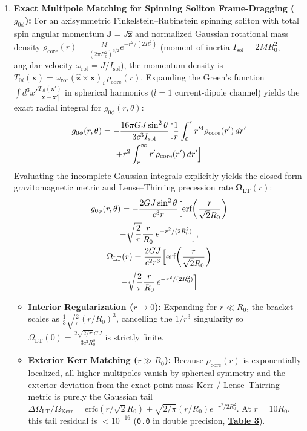 \documentclass[10pt,aps,prd,twocolumn,superscriptaddress,nofootinbib,floatfix,longbibliography,showkeys]{revtex4-2}
\begin{document}
\begin{enumerate}
  \item \textbf{Exact Multipole Matching for Spinning Soliton Frame-Dragging ($g_{0\phi}$):} For an axisymmetric Finkelstein--Rubinstein spinning soliton with total spin angular momentum $\mathbf{J} = J\hat{\mathbf{z}}$ and normalized Gaussian rotational mass density $\rho_{\text{core}}(r) = \frac{M}{(2\pi R_0^2)^{3/2}}e^{-r^2/(2R_0^2)}$ (moment of inertia $I_{\text{sol}} = 2 M R_0^2$, angular velocity $\omega_{\text{rot}} = J / I_{\text{sol}}$), the momentum density is $T_{0i}(\mathbf{x}) = \omega_{\text{rot}}(\hat{\mathbf{z}} \times \mathbf{x})_i\,\rho_{\text{core}}(r)$. Expanding the Green's function $\int d^3x' \frac{T_{0i}(\mathbf{x}')}{|\mathbf{x} - \mathbf{x}'|}$ in spherical harmonics ($l=1$ current-dipole channel) yields the exact radial integral for $g_{0\phi}(r, \theta)$:
\begin{multline}
g_{0\phi}(r, \theta) = -\frac{16\pi G J \sin^2\theta}{3 c^3 I_{\text{sol}}}\Bigl[ \frac{1}{r}\int_0^r r'^4 \rho_{\text{core}}(r')\,dr' \\
+ r^2 \int_r^\infty r' \rho_{\text{core}}(r')\,dr' \Bigr]
\end{multline}
  Evaluating the incomplete Gaussian integrals explicitly yields the closed-form gravitomagnetic metric and Lense--Thirring precession rate $\boldsymbol{\Omega}_{\text{LT}}(r)$:
\begin{equation}\begin{gathered}
g_{0\phi}(r, \theta) = -\frac{2 G J \sin^2\theta}{c^3 r}\Bigl[ \text{erf}\!\left(\frac{r}{\sqrt{2}R_0}\right) \\
- \sqrt{\frac{2}{\pi}}\frac{r}{R_0}\,e^{-r^2/(2R_0^2)} \Bigr], \\
\Omega_{\text{LT}}(r) = \frac{2 G J}{c^2 r^3}\Bigl[ \text{erf}\!\left(\frac{r}{\sqrt{2}R_0}\right) \\
- \sqrt{\frac{2}{\pi}}\frac{r}{R_0}\,e^{-r^2/(2R_0^2)} \Bigr]
\end{gathered}\end{equation}
  \begin{itemize}
    \item \textbf{Interior Regularization ($r \to 0$):} Expanding for $r \ll R_0$, the bracket scales as $\frac{1}{3}\sqrt{\frac{2}{\pi}}(r/R_0)^3$, cancelling the $1/r^3$ singularity so $\Omega_{\text{LT}}(0) = \frac{2\sqrt{2/\pi}\,GJ}{3 c^2 R_0^3}$ is strictly finite.
    \item \textbf{Exterior Kerr Matching ($r \gg R_0$):} Because $\rho_{\text{core}}(r)$ is exponentially localized, all higher multipoles vanish by spherical symmetry and the exterior deviation from the exact point-mass Kerr / Lense--Thirring metric is purely the Gaussian tail $\Delta\Omega_{\text{LT}}/\Omega_{\text{Kerr}} = \text{erfc}(r/\sqrt{2}R_0) + \sqrt{2/\pi}(r/R_0)e^{-r^2/2R_0^2}$. At $r = 10 R_0$, this tail residual is $< 10^{-16}$ (\texttt{0.0} in double precision, \textbf{\hyperref[tab:table3]{Table 3}}).


\end{itemize}
\end{enumerate}
\end{document}
